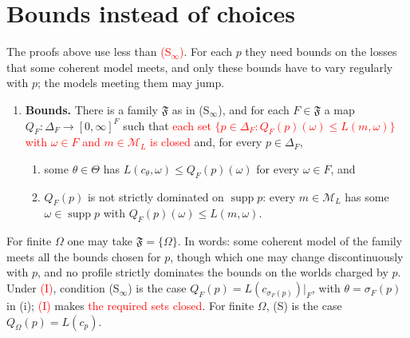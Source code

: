 \documentclass[11pt]{article}
\theoremstyle{definition}
\theoremstyle{remark}
\newcommand{\M}{\mathcal M}
\newcommand{\F}{\mathfrak F}
\newcommand{\supp}{\operatorname{supp}}
\begin{document}
\section{Bounds instead of choices}\label{sec:bounds}
The proofs above use less than \textcolor{red}{(S$_\infty$)}. For each $p$ they need bounds on the losses that some coherent model meets, and only these bounds have to vary regularly with $p$; the models meeting them may jump.
\begin{enumerate}[label=\textbf{(B)},leftmargin=*]
\item \textbf{Bounds.} There is a family $\F$ as in (S$_\infty$), and for each $F\in\F$ a map $Q_F:\Delta_F\to[0,\infty]^F$ such that \textcolor{red}{each set $\{p\in\Delta_F:Q_F(p)(\omega)\le L(m,\omega)\}$ with $\omega\in F$ and $m\in\M_L$ is closed} and, for every $p\in\Delta_F$,
\begin{enumerate}[label=(\roman*)]
\item some $\theta\in\Theta$ has $L(c_\theta,\omega)\le Q_F(p)(\omega)$ for every $\omega\in F$, and
\item $Q_F(p)$ is not strictly dominated on $\supp p$: every $m\in\M_L$ has some $\omega\in\supp p$ with $Q_F(p)(\omega)\le L(m,\omega)$.
\end{enumerate}
\end{enumerate}
For finite $\Omega$ one may take $\F=\{\Omega\}$. In words: some coherent model of the family meets all the bounds chosen for $p$, though which one may change discontinuously with $p$, and no profile strictly dominates the bounds on the worlds charged by $p$. Under \textcolor{red}{(I)}, condition (S$_\infty$) is the case $Q_F(p)=L(c_{\sigma_F(p)})|_F$, with $\theta=\sigma_F(p)$ in (i); \textcolor{red}{(I)} makes \textcolor{red}{the required sets closed}. For finite $\Omega$, (S) is the case $Q_\Omega(p)=L(c_p)$.
\end{document}
